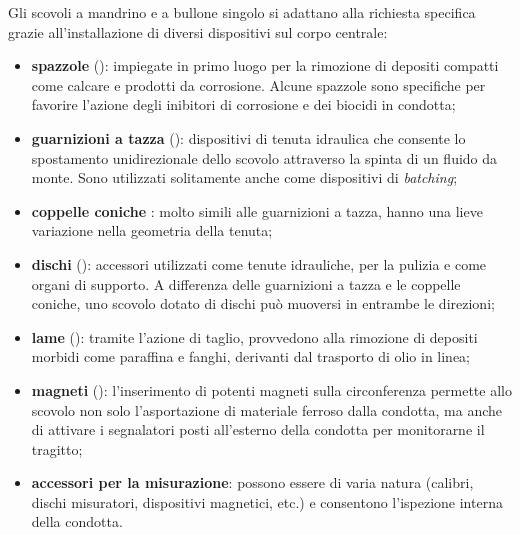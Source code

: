 Gli scovoli a mandrino e a bullone singolo si adattano alla richiesta specifica grazie all'installazione di diversi dispositivi sul corpo centrale:
\begin{itemize}
\item \textbf{spazzole} ():  impiegate in primo luogo per la rimozione di depositi compatti come calcare e prodotti da corrosione. Alcune spazzole sono specifiche per favorire l'azione degli inibitori di corrosione e dei biocidi in condotta;
\item \textbf{guarnizioni a tazza} (): dispositivi di tenuta idraulica che consente lo spostamento unidirezionale dello scovolo attraverso la spinta di un fluido da monte. Sono utilizzati solitamente anche come dispositivi di \textit{batching};
\item \textbf{coppelle coniche} : molto simili alle guarnizioni a tazza, hanno una lieve variazione nella geometria della tenuta;
\item \textbf{dischi} (): accessori utilizzati come tenute idrauliche, per la pulizia e come organi di supporto. A differenza delle guarnizioni a tazza e le coppelle coniche, uno scovolo dotato di dischi può muoversi in entrambe le direzioni;
\item \textbf{lame} (): tramite l'azione di taglio, provvedono alla rimozione di depositi morbidi come paraffina e fanghi, derivanti dal trasporto di olio in linea;
\item \textbf{magneti} (): l'inserimento di potenti magneti sulla circonferenza permette allo scovolo non solo l'asportazione di materiale ferroso dalla condotta, ma anche di attivare i segnalatori posti all'esterno della condotta per monitorarne il tragitto;
\item \textbf{accessori per la misurazione}: possono essere di varia natura (calibri, dischi misuratori, dispositivi magnetici, etc.) e consentono l'ispezione interna della condotta.
\end{itemize}

